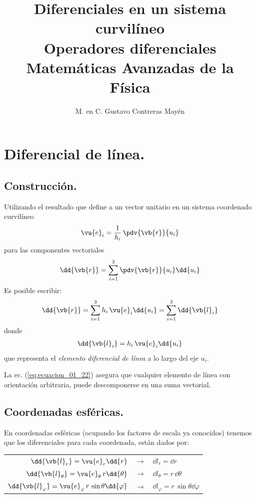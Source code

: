 
\usepackage{apacite}
\title{Diferenciales en un sistema curvilíneo \\ Operadores diferenciales \\[0.3em]  \large{Matemáticas Avanzadas de la Física}\vspace{-3ex}}
\author{M. en C. Gustavo Contreras Mayén}
\date{ }

\vspace{-4cm}
\maketitle
\fontsize{14}{14}\selectfont
\tableofcontents
\newpage
\section{Diferencial de línea.}
\subsection{Construcción.}
Utilizando el resultado que define a un vector unitario en un sistema coordenado curvilíneo
\begin{align*}
\vu{e}_{i} = \dfrac{1}{h_{i}} \, \pdv{\vb{r}}{u_{i}}
\end{align*}
para las componentes vectoriales
\begin{align*}
\dd{\vb{r}} = \sum_{i=1}^{3} \pdv{\vb{r}}{u_{i}} \dd{u_{i}}
\end{align*}
Es posible escribir:
\begin{align}
\dd{\vb{r}} = \sum_{i=1}^{3} h_{i} \, \vu{e}_{i} \dd{u_{i}} = \sum_{i=1}^{3} \dd{\vb{l}_{i}}
\label{eq:ecuacion_01_21}
\end{align}
donde
\begin{align}
\dd{\vb{l}_{i}} = h_{i} \, \vu{e}_{i} \dd{u_{i}}
\label{eq:ecuacion_01_22}
\end{align}
que representa el \emph{elemento diferencial de línea} a lo largo del eje $u_{i}$.
\par
La ec. (\ref{eq:ecuacion_01_22}) asegura que cualquier elemento de línea con orientación arbitraria, puede descomponerse en una suma vectorial.
\subsection{Coordenadas esféricas.}
En coordenadas esféricas (ocupando los factores de escala ya conocidos) tenemos que los diferenciales para cada coordenada, están dados por:
\begin{table}[H]
\centering
\begin{tabular}{r  c  l}
$\dd{\vb{l}_{r}} = \vu{e}_{r} \dd{r}$ & $\longrightarrow$ & $\dd{l_{r}} = \dd{r}$ \\
$\dd{\vb{l}_{\theta}} = \vu{e}_{\theta} \, r \dd{\theta}$ & $\longrightarrow$ & $\dd{l_{\theta}} = r \, \dd{\theta}$ \\
$\dd{\vb{l}_{\varphi}} = \vu{e}_{\varphi} \, r \, \sin \theta \dd{\varphi}$ & $\longrightarrow$ & $\dd{l_{\varphi}} = r \, \sin \theta \dd{\varphi}$ \\
\end{tabular}
\end{table}
